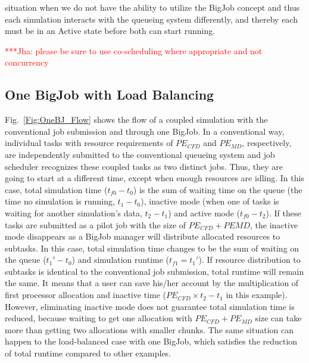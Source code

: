 \documentclass[conference,final]{IEEEtran}
\newcommand{\jhanote}[1]{ {\textcolor{red} { ***Jha: #1 }}}
\newcommand{\jhanote}[1]{}
\begin{document}
situation when we do not have the ability to utilize the BigJob concept and thus each 
simulation interacts with the queueing system differently, and thereby each must be in an 
Active state before both can start running.

\jhanote{please be sure to use co-scheduling where appropriate and not concurrency}

\subsection{One BigJob with Load Balancing}
Fig.~\ref{Fig:OneBJ_Flow} shows the flow of a coupled simulation with the conventional 
job submission and through one BigJob. In a conventional way, individual tasks with 
resource requirements of $PE_{CFD}$ and $PE_{MD}$, respectively, are independently 
submitted to the conventional queueing system and job scheduler recognizes these coupled 
tasks as two distinct jobs. Thus, they are going to start at a different time, except 
when enough resources are idling. In this case, total simulation time ($t_{f0}-t_{0}$) is 
the sum of waiting time on the queue (the time no simulation is running, $t_1-t_0$), 
inactive mode (when one of tasks is waiting for another simulation's data, $t_2-t_1$) and 
active mode ($t_{f0}-t_2$).
If these tasks are submitted as a pilot job with the size of $PE_{CFD}+PE{MD}$, the 
inactive mode disappears as a BigJob manager will distribute allocated resources to 
subtasks. In this case, total simulation time changes to be the sum of waiting on the 
queue ($t_{1}'-t_{0}$) and simulation runtime ($t_{f1}=t_{1}'$). If resource distribution 
to subtasks is identical to the conventional job submission, total runtime will remain 
the same. It means that a user can save his/her account by the multiplication of first 
processor allocation and inactive time ($PE_{CFD} \times t_2-t_1$ in this example). 
However, eliminating inactive mode does not guarantee total simulation time is reduced, 
because waiting to get one allocation with $PE_{CFD}+PE_{MD}$ size can take more than 
getting two allocations with smaller chunks. The same situation can happen to the 
load-balanced case with one BigJob, which satisfies the reduction of total runtime 
compared to other examples.
\end{document}
